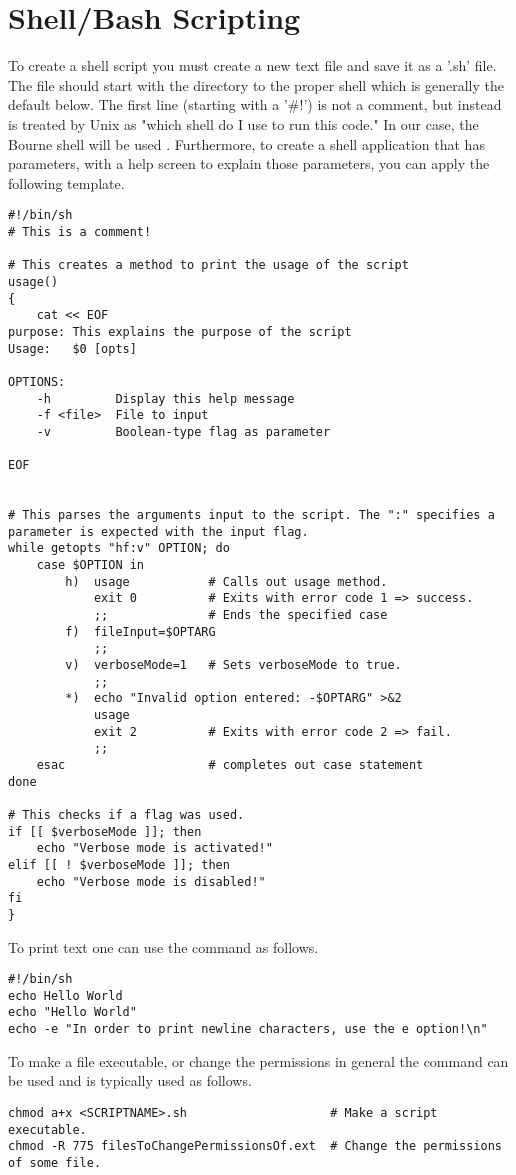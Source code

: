 \section{Shell/Bash Scripting}

\lstset{language=Bash, style=shellstyle}

To create a shell script you must create a new text file and save it as a '.sh' file. The file should start with the directory to the proper shell which is generally the default below. The first line (starting with a  '\#!') is not a comment, but instead is treated by Unix as "which shell do I use to run this code." In our case, the Bourne shell will be used \cite{linux: shell scripting}. Furthermore, to create a shell application that has parameters, with a help screen to explain those parameters, you can apply the following template.
\begin{lstlisting}
#!/bin/sh
# This is a comment!

# This creates a method to print the usage of the script
usage()
{
	cat << EOF
purpose: This explains the purpose of the script
Usage:   $0 [opts]

OPTIONS:
	-h         Display this help message
	-f <file>  File to input
	-v         Boolean-type flag as parameter
	
EOF


# This parses the arguments input to the script. The ":" specifies a parameter is expected with the input flag.
while getopts "hf:v" OPTION; do
	case $OPTION in
		h)	usage			# Calls out usage method.
			exit 0			# Exits with error code 1 => success.
			;;				# Ends the specified case
		f)	fileInput=$OPTARG
			;;
		v)	verboseMode=1	# Sets verboseMode to true.
			;;
		*)	echo "Invalid option entered: -$OPTARG" >&2
			usage
			exit 2			# Exits with error code 2 => fail.
			;;
	esac					# completes out case statement
done

# This checks if a flag was used.
if [[ $verboseMode ]]; then
	echo "Verbose mode is activated!"
elif [[ ! $verboseMode ]]; then
	echo "Verbose mode is disabled!"
fi
}
\end{lstlisting}

To print text one can use the  command as follows.
\begin{lstlisting}
#!/bin/sh
echo Hello World
echo "Hello World"
echo -e "In order to print newline characters, use the e option!\n"
\end{lstlisting}

To make a file executable, or change the permissions in general the  command can be used and is typically used as follows.
\begin{lstlisting}
chmod a+x <SCRIPTNAME>.sh					 # Make a script executable.
chmod -R 775 filesToChangePermissionsOf.ext  # Change the permissions of some file.
\end{lstlisting}

